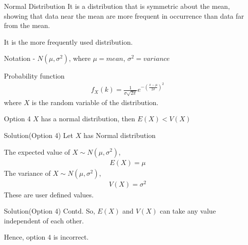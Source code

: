 \documentclass{beamer}
\begin{document}
\begin{frame}{}
    \begin{block}{Normal Distribution}
     It is a distribution that is symmetric about the mean, showing that data near the mean are more frequent in occurrence than data far from the mean. 
     
     It is the more frequently used distribution.
    
    Notation - $N(\mu,\sigma^2)$, where $\mu = mean$, $\sigma^2 = variance$
    \end{block}
    \begin{block}{Probability function}
    \begin{align}
        f_X(k)=\frac{1}{\sigma\sqrt{2\pi}}e^{-(\frac{x-\mu}{2\sigma})^2}
    \end{align}
    where $X$ is the random variable of the distribution.
    \end{block}
\end{frame}
\begin{frame}{Option 4}
    $X$ has a normal distribution, then $E(X)<V(X)$
\end{frame}
\begin{frame}{Solution(Option 4)}
    Let $X$ has Normal distribution
    
    The expected value of $X \sim N(\mu,\sigma^2)$,
    \begin{align}
        E(X)=\mu
    \end{align}
    The variance of $X \sim N(\mu,\sigma^2)$,
    \begin{align}
        V(X)=\sigma^2
    \end{align}
    These are user defined values.
\end{frame}
\begin{frame}{Solution(Option 4) Contd.}
    So, $E(X)$ and $V(X)$ can take any value independent of each other.
    
    Hence, option $4$ is incorrect.
\end{frame}
\end{document}
